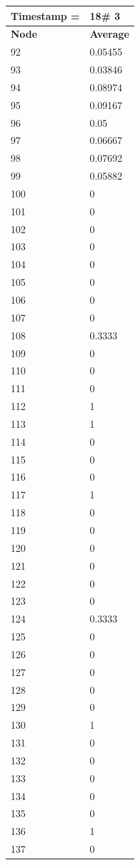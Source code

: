 \begin{tabular}{|l||l|}
\hline
\textbf{Timestamp =} & \textbf{18}\# 3\\\hline
	\textbf{Node} & \textbf{Average} \\ \hline
\hline
	92 & 0.05455 \\ \hline
	93 & 0.03846 \\ \hline
	94 & 0.08974 \\ \hline
	95 & 0.09167 \\ \hline
	96 & 0.05 \\ \hline
	97 & 0.06667 \\ \hline
	98 & 0.07692 \\ \hline
	99 & 0.05882 \\ \hline
	100 & 0 \\ \hline
	101 & 0 \\ \hline
	102 & 0 \\ \hline
	103 & 0 \\ \hline
	104 & 0 \\ \hline
	105 & 0 \\ \hline
	106 & 0 \\ \hline
	107 & 0 \\ \hline
	108 & 0.3333 \\ \hline
	109 & 0 \\ \hline
	110 & 0 \\ \hline
	111 & 0 \\ \hline
	112 & 1 \\ \hline
	113 & 1 \\ \hline
	114 & 0 \\ \hline
	115 & 0 \\ \hline
	116 & 0 \\ \hline
	117 & 1 \\ \hline
	118 & 0 \\ \hline
	119 & 0 \\ \hline
	120 & 0 \\ \hline
	121 & 0 \\ \hline
	122 & 0 \\ \hline
	123 & 0 \\ \hline
	124 & 0.3333 \\ \hline
	125 & 0 \\ \hline
	126 & 0 \\ \hline
	127 & 0 \\ \hline
	128 & 0 \\ \hline
	129 & 0 \\ \hline
	130 & 1 \\ \hline
	131 & 0 \\ \hline
	132 & 0 \\ \hline
	133 & 0 \\ \hline
	134 & 0 \\ \hline
	135 & 0 \\ \hline
	136 & 1 \\ \hline
	137 & 0 \\ \hline
\end{tabular}

